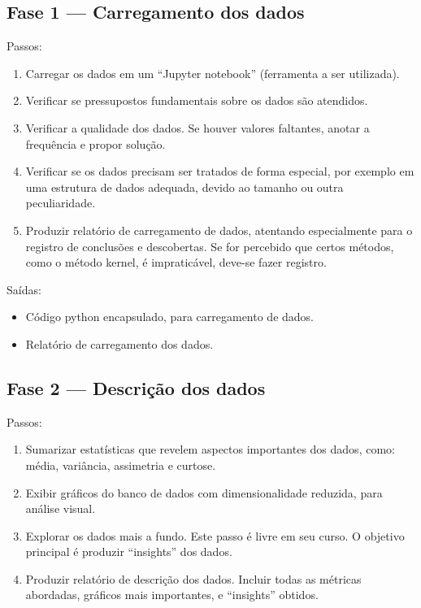 \documentclass[12pt,oneside,a4paper]{article}
\begin{document}
\subsection{Fase 1 --- Carregamento dos dados}

Passos:

\begin{enumerate}
    \item Carregar os dados em um ``Jupyter notebook'' (ferramenta a ser utilizada).
    
    \item Verificar se pressupostos fundamentais sobre os dados são atendidos.

    \item Verificar a qualidade dos dados. Se houver valores faltantes, anotar a frequência e propor solução.
    
    \item Verificar se os dados precisam ser tratados de forma especial, por exemplo em uma estrutura de dados adequada, devido ao tamanho ou outra peculiaridade.
    
    \item Produzir relatório de carregamento de dados, atentando especialmente para o registro de conclusões e descobertas. Se for percebido que certos métodos, como o método kernel, é impraticável, deve-se fazer registro.
    
\end{enumerate}

Saídas:

\begin{itemize}
    \item Código python encapsulado, para carregamento de dados.
    \item Relatório de carregamento dos dados.
\end{itemize}

\subsection{Fase 2 --- Descrição dos dados}

Passos:

\begin{enumerate}
    \item Sumarizar estatísticas que revelem aspectos importantes dos dados, como: média, variância, assimetria e curtose.
    
    \item Exibir gráficos do banco de dados com dimensionalidade reduzida, para análise visual.
    
    \item Explorar os dados mais a fundo. Este passo é livre em seu curso. O objetivo principal é produzir ``insights'' dos dados.
    
    \item Produzir relatório de descrição dos dados. Incluir todas as métricas abordadas, gráficos mais importantes, e ``insights'' obtidos.
      
\end{enumerate}
\end{document}
